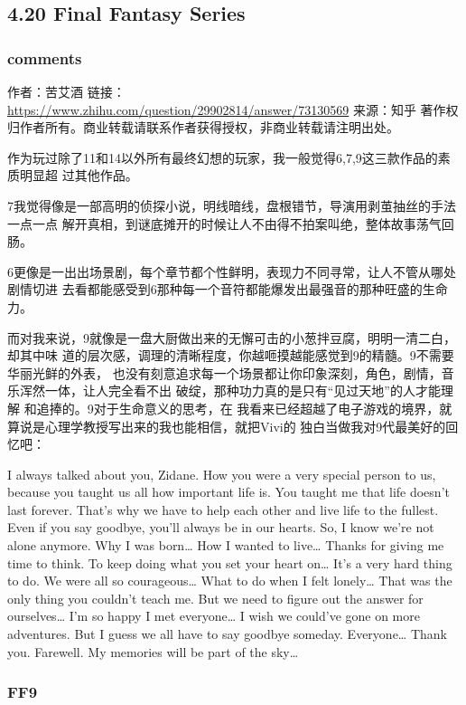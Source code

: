 \documentclass[11pt]{article}
\begin{document}
\subsection*{4.20 Final Fantasy Series}
\label{sec:orgheadline220}

\subsubsection*{comments}
\label{sec:orgheadline217}
作者：苦艾酒
链接：\url{https://www.zhihu.com/question/29902814/answer/73130569}
来源：知乎
著作权归作者所有。商业转载请联系作者获得授权，非商业转载请注明出处。

作为玩过除了11和14以外所有最终幻想的玩家，我一般觉得6,7,9这三款作品的素质明显超
过其他作品。

7我觉得像是一部高明的侦探小说，明线暗线，盘根错节，导演用剥茧抽丝的手法一点一点
解开真相，到谜底摊开的时候让人不由得不拍案叫绝，整体故事荡气回肠。

6更像是一出出场景剧，每个章节都个性鲜明，表现力不同寻常，让人不管从哪处剧情切进
去看都能感受到6那种每一个音符都能爆发出最强音的那种旺盛的生命力。

而对我来说，9就像是一盘大厨做出来的无懈可击的小葱拌豆腐，明明一清二白，却其中味
道的层次感，调理的清晰程度，你越咂摸越能感觉到9的精髓。9不需要 华丽光鲜的外表，
也没有刻意追求每一个场景都让你印象深刻，角色，剧情，音乐浑然一体，让人完全看不出
破绽，那种功力真的是只有“见过天地”的人才能理解 和追捧的。9对于生命意义的思考，在
我看来已经超越了电子游戏的境界，就算说是心理学教授写出来的我也能相信，就把Vivi的
独白当做我对9代最美好的回 忆吧：

I always talked about you, Zidane. How you were a very special person to us,
because you taught us all how important life is. You taught me that life doesn't
last forever. That's why we have to help each other and live life to the
fullest. Even if you say goodbye, you'll always be in our hearts. So, I know
we're not alone anymore. Why I was born\ldots{} How I wanted to live\ldots{} Thanks for
giving me time to think. To keep doing what you set your heart on\ldots{} It's a very
hard thing to do. We were all so courageous\ldots{} What to do when I felt lonely\ldots{}
That was the only thing you couldn't teach me. But we need to figure out the
answer for ourselves\ldots{} I'm so happy I met everyone\ldots{} I wish we could've gone
on more adventures. But I guess we all have to say goodbye someday. Everyone\ldots{}
Thank you. Farewell. My memories will be part of the sky\ldots{}

\subsubsection*{FF9}
\label{sec:orgheadline219}
\end{document}
